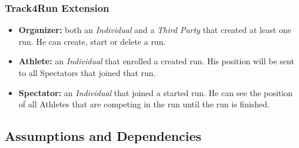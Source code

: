 \documentclass[a4paper]{article}
\begin{document}
        \subsubsection{Track4Run Extension}
        \begin{itemize}
            \item \textbf{Organizer:} both an \textit{Individual} and a \textit{Third Party} that created at least one run. He can create, start or delete a run.
            \item \textbf{Athlete:} an \textit{Individual} that enrolled a created run. His position will be sent to all Spectators that joined that run.
            \item \textbf{Spectator:} an \textit{Individual} that joined a started run. He can see the position of all Athletes that are competing in the run until the run is finished.
        \end{itemize}
    
    \subsection{Assumptions and Dependencies}
\end{document}

